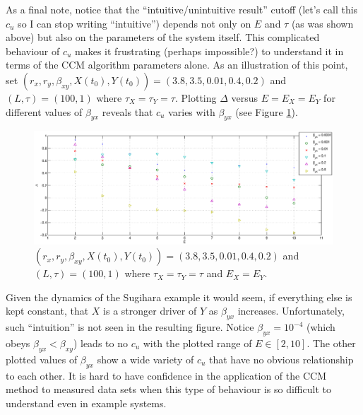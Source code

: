 \documentclass[a4paper,11pt]{article}
\begin{document}
As a final note, notice that the ``intuitive/unintuitive result'' cutoff (let's call this $c_u$ so I can stop writing ``intuitive'') depends not only on $E$ and $\tau$ (as was shown above) but also on the parameters of the system itself.  This complicated behaviour of $c_u$ makes it frustrating (perhaps impossible?) to understand it in terms of the CCM algorithm parameters alone.  As an illustration of this point, set $\left(r_x,r_y,\beta_{xy},X(t_0),Y(t_0)\right) = \left(3.8,3.5,0.01,0.4,0.2\right)$ and $\left(L,\tau\right) = \left(100,1\right)$ where $\tau_X=\tau_Y=\tau$.  Plotting $\Delta$ versus $E=E_X=E_Y$ for different values of $\beta_{yx}$ reveals that $c_u$ varies with $\beta_{yx}$ (see Figure \ref{fig:SugExvEdimvByx}).
\begin{figure}[h!t]
\centering
\label{fig:SugExvEdimvByx}
\includegraphics[scale=0.55]{graphics/SugExvEdimvByx.eps}
\caption{$\left(r_x,r_y,\beta_{xy},X(t_0),Y(t_0)\right) = \left(3.8,3.5,0.01,0.4,0.2\right)$ and $\left(L,\tau\right) = \left(100,1\right)$ where $\tau_X=\tau_Y=\tau$ and $E_X=E_Y$.}
\end{figure}
Given the dynamics of the Sugihara example it would seem, if everything else is kept constant, that $X$ is a stronger driver of $Y$ as $\beta_{yx}$ increases.  Unfortunately, such ``intuition'' is not seen in the resulting figure.  Notice $\beta_{yx} = 10^{-4}$ (which obeys $\beta_{yx} < \beta_{xy}$) leads to no $c_u$ with the plotted range of $E\in[2,10]$.  The other plotted values of $\beta_{yx}$ show a wide variety of $c_u$ that have no obvious relationship to each other.  It is hard to have confidence in the application of the CCM method to measured data sets when this type of behaviour is so difficult to understand even in example systems.
\end{document}
